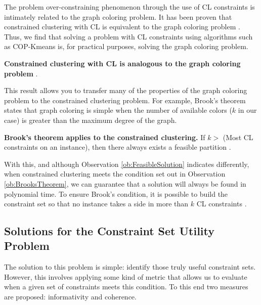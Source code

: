 The problem over-constraining phenomenon through the use of \acs{CL} constraints is intimately related to the graph coloring problem. It has been proven that constrained clustering with \acs{CL} is equivalent to the graph coloring problem \cite{davidson2006identifying}. Thus, we find that solving a problem with \acs{CL} constraints using algorithms such as COP-Kmeans is, for practical purposes, solving the graph coloring problem.

\begin{observation}
	
	\textbf{Constrained clustering with \acs{CL} is analogous to the graph coloring problem} \cite{davidson2007survey}.
	
\end{observation}

This result allows you to transfer many of the properties of the graph coloring problem to the constrained clustering problem. For example, Brook's theorem states that graph coloring is simple when the number of available colors ($k$ in our case) is greater than the maximum degree of the graph.

\begin{observation}
	
	\textbf{Brook's theorem applies to the constrained clustering.}
	If $ k > $ (Most \acs{CL} constraints on an instance), then there always exists a feasible partition \cite{davidson2007survey} \label{ob:BrooksTheorem}.
	
\end{observation}

With this, and although Observation \ref{ob:FeasibleSolution} indicates differently, when constrained clustering meets the condition set out in Observation \ref{ob:BrooksTheorem}, we can guarantee that a solution will always be found in polynomial time. To ensure Brook's condition, it is possible to build the constraint set so that no instance takes a side in more than $k$ \acs{CL} constraints \cite{davidson2006identifying}.

\subsection{Solutions for the Constraint Set Utility Problem}

The solution to this problem is simple: identify those truly useful constraint sets. However, this involves applying some kind of metric that allows us to evaluate when a given set of constraints meets this condition. To this end two measures are proposed: informativity and coherence.

